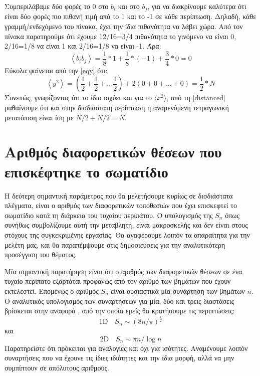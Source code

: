 \newpage
Συμπεριλάβαμε δύο φορές το $0$ στο $b_i$ και στο $b_j$, για να διακρίνουμε καλύτερα ότι είναι δύο φορές πιο πιθανή τιμή από το 1 και το -1 σε κάθε περίπτωση. Δηλαδή, κάθε γραμμή/ενδεχόμενο του πίνακα, έχει την ίδια πιθανότητα να λάβει χώρα. Από τον πίνακα παρατηρούμε ότι έχουμε 12/16=3/4 πιθανότητα το γινόμενο να είναι 0, 2/16=1/8 να είναι 1 και 2/16=1/8 να είναι -1. Άρα: 
\begin{equation}
\left\langle b_{i} b_{j}\right\rangle = \frac{1}{8}*1+\frac{1}{8}*(-1)+\frac{3}{4}*0=0
\end{equation}
Εύκολα φαίνεται από την \eqref{eqy} ότι: 
\begin{equation}
\left\langle y^{2}\right\rangle = \left( \frac{1}{2}+\frac{1}{2}+\ldots \frac{1}{2}\right)+2 \left( 0+0+\ldots+0 \right)=\frac{1}{2}*N
\end{equation}
Συνεπώς, γνωρίζοντας ότι το ίδιο ισχύει και για το $\langle x^2 \rangle $, από τη \eqref{distanced} μαθαίνουμε ότι και στην δισδιάστατη περίπτωση η αναμενόμενη τετραγωνική μετατόπιση είναι ίση με $N/2+N/2 = N$.
\section{Αριθμός διαφορετικών θέσεων που επισκέφτηκε το σωματίδιο}
Η δεύτερη σημαντική παράμετρος που θα μελετήσουμε κυρίως σε δισδιάστατα πλέγματα, είναι ο αριθμός των διαφορετικών τοποθεσιών που έχει επισκεφτεί το σωματίδιο κατά τη διάρκεια του τυχαίου περιπάτου. Ο υπολογισμός της $S_n$ όπως συνήθως συμβολίζουμε αυτή την μεταβλητή, είναι μακροσκελής και δεν είναι στους στόχους της συγκεκριμένης εργασίας. Θα αναφέρουμε λοιπόν τα απαραίτητα για την μελέτη μας, και θα παραπέμψουμε στις δημοσιεύσεις για την αναλυτικότερη προσέγγιση του θέματος.

Μία σημαντική παρατήρηση είναι ότι ο αριθμός των διαφορετικών θέσεων σε ένα τυχαίο περίπατο εξαρτάται προφανώς από τον αριθμό των βημάτων που έχουν εκτελεστεί. Επομένως ο αριθμός $S_n$ είναι ουσιαστικά μία συνάρτηση των βημάτων $n$. Ο αναλυτικός υπολογισμός των συναρτήσεων για μία, δύο και τρεις διαστάσεις βρίσκεται στην αναφορά \citep{montroll1965random}, από την οποία εμείς θα κρατήσουμε τις περιπτώσεις:
\begin{equation}
1 \mathrm{D} \quad S_{n} \sim(8 n / \pi)^{\frac{1}{2}}
\label{1D_S}
\end{equation}
και 
\begin{equation}
2 \mathrm{D} \quad S_{n} \sim \pi n / \log n
\label{2D_S}
\end{equation}
\newpage
Παρατηρείστε ότι πρόκειται για αναλογίες και όχι για ισότητες. Αναμένουμε λοιπόν συναρτήσεις που να έχουνε τις ίδιες ιδιότητες και την ίδια μορφή, αλλά να μην συμπίπτουν σε απόλυτους αριθμούς.
